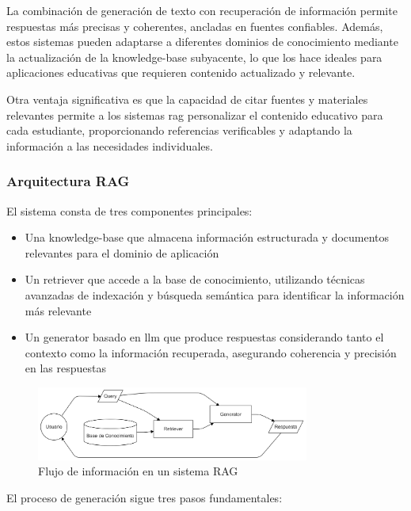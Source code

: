 La combinación de generación de texto con recuperación de información permite respuestas más precisas y coherentes, ancladas en fuentes confiables. Además, estos sistemas pueden adaptarse a diferentes dominios de conocimiento mediante la actualización de la \gls{knowledge-base} subyacente, lo que los hace ideales para aplicaciones educativas que requieren contenido actualizado y relevante.

Otra ventaja significativa es que la capacidad de citar fuentes y materiales relevantes permite a los sistemas \gls{rag} personalizar el contenido educativo para cada estudiante, proporcionando referencias verificables y adaptando la información a las necesidades individuales.

\subsubsection{Arquitectura RAG}

El sistema consta de tres componentes principales:

\begin{itemize}
  \item Una \gls{knowledge-base} que almacena información estructurada y documentos relevantes para el dominio de aplicación

  \item Un \gls{retriever} que accede a la base de conocimiento, utilizando técnicas avanzadas de indexación y búsqueda semántica para identificar la información más relevante

  \item Un \gls{generator} basado en \gls{llm} que produce respuestas considerando tanto el contexto como la información recuperada, asegurando coherencia y precisión en las respuestas
\end{itemize}

\begin{figure}[h]
  \centering
  \includegraphics[width=0.8\textwidth]{figuras/rag-flow.png}
  \caption{Flujo de información en un sistema RAG}
  \label{fig:rag-flow}
\end{figure}

El proceso de generación sigue tres pasos fundamentales:

